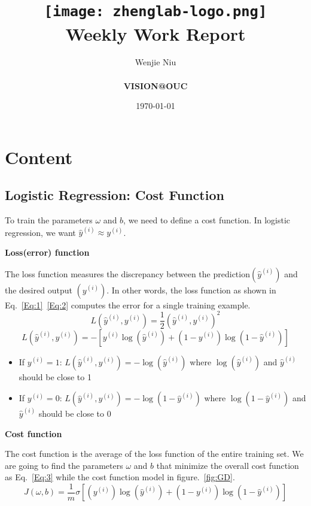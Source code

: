 \documentclass[a4paper]{article}
\title{
    \vspace*{1in}
    \texttt{[image: zhenglab-logo.png]} \\
    \vspace*{1.2in}
    \textbf{\huge Weekly Work Report}
    \vspace{0.2in}
}
\author{Wenjie Niu \\
    \vspace*{0.5in} \\
    \textbf{VISION@OUC} \\
    \vspace*{1in}
}
\date{\today}
\begin{document}
\maketitle
\setcounter{page}{0}
\thispagestyle{empty}
\newpage


\section{Content}
\subsection{Logistic Regression: Cost Function}
To train the parameters $\omega$ and $b$, we need to define a cost function. In logistic regression, we want $\hat{y}^{(i)} \approx y^{(i)}$.\par
\textbf{Loss(error) function}\par
The loss function measures the discrepancy between the prediction$(\hat{y}^{(i)})$ and the desired output $(y^{(i)})$. In other words, the loss function as shown in Eq.~\ref{Eq:1}~\ref{Eq:2} computes the error for a single training example.
\begin{equation}
L(\hat{y}^{(i)},y^{(i)})=\frac{1}{2}(\hat{y}^{(i)},y^{(i)})^2
\label{Eq:1}
\end{equation}
\begin{equation}
L(\hat{y}^{(i)},y^{(i)})=-[y^{(i)}\log(\hat{y}^{(i)})+(1-y^{(i)})\log(1-\hat{y}^{(i)})]
\label{Eq:2}
\end{equation}
\begin{itemize}
\item If $y^{(i)}=1$: $L(\hat{y}^{(i)},y^{(i)})=-\log(\hat{y}^{(i)})$ where $\log(\hat{y}^{(i)})$ and $\hat{y}^{(i)}$ should be close to 1
\item If $y^{(i)}=0$: $L(\hat{y}^{(i)},y^{(i)})=-\log(1-\hat{y}^{(i)})$ where $\log(1-\hat{y}^{(i)})$ and $\hat{y}^{(i)}$ should be close to 0
\end{itemize}

\textbf{Cost function}\par
The cost function is the average of the loss function of the entire training set. We are going to find the parameters $\omega$ and $b$ that minimize the overall cost function as Eq.~\ref{Eq:3} while the cost function model in figure.~\ref{fig:GD}.
\begin{equation}
J(\omega,b)=\frac{1}{m}\sigma[(y^{(i)})\log(\hat{y}^{(i)})+(1-y^{(i)})\log(1-\hat{y}^{(i)})]
\label{Eq:3}
\end{equation}
\end{document}

